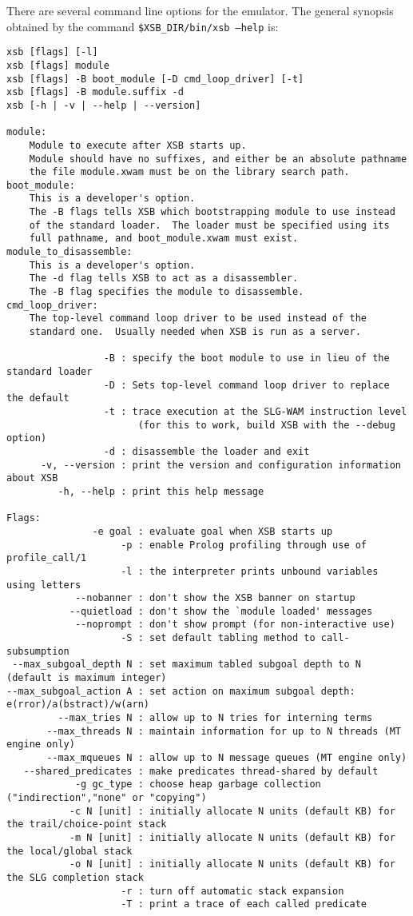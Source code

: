 There are several command line options for the emulator. The general 
synopsis obtained by the command {\tt \$XSB\_DIR/bin/xsb --help} is: 
{\small 
\begin{verbatim}
xsb [flags] [-l] 
xsb [flags] module
xsb [flags] -B boot_module [-D cmd_loop_driver] [-t] 
xsb [flags] -B module.suffix -d
xsb [-h | -v | --help | --version]

module:
    Module to execute after XSB starts up.
    Module should have no suffixes, and either be an absolute pathname
    the file module.xwam must be on the library search path.
boot_module:
    This is a developer's option.
    The -B flags tells XSB which bootstrapping module to use instead
    of the standard loader.  The loader must be specified using its
    full pathname, and boot_module.xwam must exist.
module_to_disassemble:
    This is a developer's option.
    The -d flag tells XSB to act as a disassembler.
    The -B flag specifies the module to disassemble.
cmd_loop_driver:
    The top-level command loop driver to be used instead of the
    standard one.  Usually needed when XSB is run as a server.

                 -B : specify the boot module to use in lieu of the standard loader
                 -D : Sets top-level command loop driver to replace the default
                 -t : trace execution at the SLG-WAM instruction level
                       (for this to work, build XSB with the --debug option)
                 -d : disassemble the loader and exit
      -v, --version : print the version and configuration information about XSB
         -h, --help : print this help message

Flags: 
               -e goal : evaluate goal when XSB starts up
                    -p : enable Prolog profiling through use of profile_call/1
                    -l : the interpreter prints unbound variables using letters
            --nobanner : don't show the XSB banner on startup
           --quietload : don't show the `module loaded' messages
            --noprompt : don't show prompt (for non-interactive use)
                    -S : set default tabling method to call-subsumption
 --max_subgoal_depth N : set maximum tabled subgoal depth to N (default is maximum integer)
--max_subgoal_action A : set action on maximum subgoal depth: e(rror)/a(bstract)/w(arn)
         --max_tries N : allow up to N tries for interning terms
       --max_threads N : maintain information for up to N threads (MT engine only)
       --max_mqueues N : allow up to N message queues (MT engine only)
   --shared_predicates : make predicates thread-shared by default
            -g gc_type : choose heap garbage collection ("indirection","none" or "copying")
           -c N [unit] : initially allocate N units (default KB) for the trail/choice-point stack
           -m N [unit] : initially allocate N units (default KB) for the local/global stack
           -o N [unit] : initially allocate N units (default KB) for the SLG completion stack
                    -r : turn off automatic stack expansion
                    -T : print a trace of each called predicate


\end{verbatim}}
